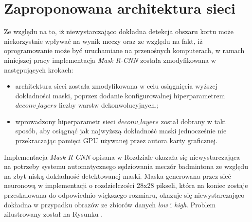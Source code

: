 \newpage
\section{Zaproponowana architektura sieci}
\label{sec:zaproponowana_architektura}

Ze względu na to, iż niewystarczająco dokładna detekcja obszaru kortu może niekorzystnie wpływać na wynik meczy oraz ze względu na fakt, iż oprogramowanie może być uruchamiane na przenośnych komputerach, w ramach niniejszej pracy implementacja \textit{Mask R-CNN} została zmodyfikowana w następujących krokach:

\begin{itemize}
	\item architektura sieci została zmodyfikowana w celu osiągnięcia wyższej dokładności maski, poprzez dodanie konfigurowalnej hiperparametrem $deconv\_layers$ liczby warstw dekonwolucyjnych.;
	\item wprowadzony hiperparametr sieci $deconv\_layers$ został dobrany w taki sposób, aby osiągnąć jak najwyższą dokładność maski jednocześnie nie przekraczając pamięci GPU używanej przez autora karty graficznej.
\end{itemize}

Implementacja \textit{Mask R-CNN} opisana w Rozdziale  okazała się niewystarczająca na potrzeby systemu automatycznego sędziowania meczór badmintona ze względu na zbyt niską dokładność detektowanej maski.
Maska generowana przez sieć neuronową w implementacji \cite{matterport-mask-rcnn} o rozdzielczości 28x28 pikseli, która na koniec zostaje przeskalowana do odpowiednio większego rozmiaru, okazuje się niewystarczająco dokładna w przypadku obrazów ze zbiorów danych \textit{low} i \textit{high}.
Problem zilustrowany został na Rysunku . 

